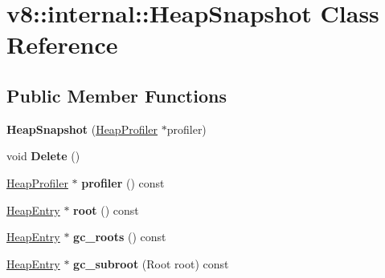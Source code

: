 \hypertarget{classv8_1_1internal_1_1HeapSnapshot}{}\section{v8\+:\+:internal\+:\+:Heap\+Snapshot Class Reference}
\label{classv8_1_1internal_1_1HeapSnapshot}
\subsection*{Public Member Functions}
\begin{DoxyCompactItemize}
\item 
\mbox{\label{classv8_1_1internal_1_1HeapSnapshot_ae9a20fbe788ade1a582bdd9fc9245ee9}} 
{\bfseries Heap\+Snapshot} (\mbox{\hyperlink{classv8_1_1internal_1_1HeapProfiler}{Heap\+Profiler}} $\ast$profiler)
\item 
\mbox{\label{classv8_1_1internal_1_1HeapSnapshot_a92b437132b6ad4bafb6bd8edd5815554}} 
void {\bfseries Delete} ()
\item 
\mbox{\label{classv8_1_1internal_1_1HeapSnapshot_ae6ea43e4d6f1b10288a03b009f363c89}} 
\mbox{\hyperlink{classv8_1_1internal_1_1HeapProfiler}{Heap\+Profiler}} $\ast$ {\bfseries profiler} () const
\item 
\mbox{\label{classv8_1_1internal_1_1HeapSnapshot_a4f80e65fbba028522b77e26d0a0f94a1}} 
\mbox{\hyperlink{classv8_1_1internal_1_1HeapEntry}{Heap\+Entry}} $\ast$ {\bfseries root} () const
\item 
\mbox{\label{classv8_1_1internal_1_1HeapSnapshot_ad64e88f6d9da9118f27241be6a3194b2}} 
\mbox{\hyperlink{classv8_1_1internal_1_1HeapEntry}{Heap\+Entry}} $\ast$ {\bfseries gc\+\_\+roots} () const
\item 
\mbox{\label{classv8_1_1internal_1_1HeapSnapshot_a3edded26a99bf4b2478edc212c1d655a}} 
\mbox{\hyperlink{classv8_1_1internal_1_1HeapEntry}{Heap\+Entry}} $\ast$ {\bfseries gc\+\_\+subroot} (Root root) const
\item 
\mbox{\label{classv8_1_1internal_1_1HeapSnapshot_a9335bae989d17454e4d789759f2b8afe}} 

\end{DoxyCompactItemize}

